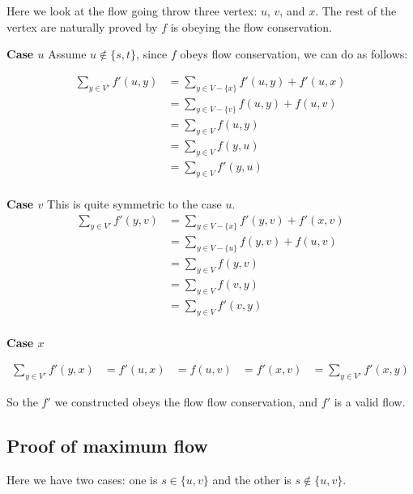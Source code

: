 \documentclass[12pt]{article}
\begin{document}
Here we look at the flow going throw three vertex: $u$, $v$, and $x$. The rest of the vertex are naturally proved by $f$ is obeying the flow conservation. 

\textbf{Case $u$} Assume $u \notin \{s,t\} $, since $f$ obeys flow conservation, we can do as follows:

\begin{equation}
\begin{aligned}
\sum_{y \in V'} f'(u,y) &= \sum_{y \in V - \{x\}} f'(u,y) + f'(u,x)\\
&= \sum_{y \in V - \{v\}} f(u,y) + f(u,v)\\
&= \sum_{y \in V} f(u,y) \\
&= \sum_{y \in V} f(y,u) \\
&= \sum_{y \in V} f'(y,u) \\
\end{aligned}
\end{equation}

\textbf{Case $v$}
This is quite symmetric to the case $u$.
\begin{equation}
\begin{aligned}
\sum_{y \in V'} f'(y,v) &= \sum_{y \in V - \{x\}} f'(y,v) + f'(x,v)\\
&= \sum_{y \in V - \{u\}} f(y,v) + f(u,v)\\
&= \sum_{y \in V} f(y,v) \\
&= \sum_{y \in V} f(v,y) \\
&= \sum_{y \in V} f'(v,y) \\
\end{aligned}
\end{equation}

\textbf{Case $x$}

\begin{equation}
\begin{aligned}
\sum_{y \in V'} f'(y,x) &= f'(u,x)
&= f(u,v)
&= f'(x,v)
&= \sum_{y \in V'} f'(x,y)
\end{aligned}
\end{equation}


So the $f'$ we constructed obeys the flow flow conservation, and $f'$ is a valid flow.

\subsection{Proof of maximum flow}
Here we have two cases: one is $s \in \{u, v\}$ and the other is $s \notin \{u, v\}$. 
\end{document}
